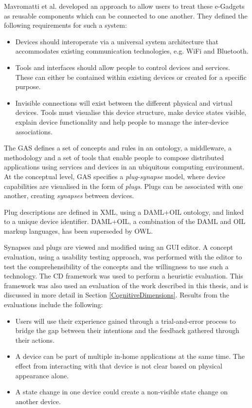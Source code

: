 Mavromatti et al. \cite{Mavrommati2004} developed an approach to allow users to treat these e-Gadgets as reusable components which can be connected to one another. They defined the following requirements for such a system:

\begin{itemize}
	\item Devices should interoperate via a universal system architecture that accommodates existing communication technologies, e.g. WiFi and Bluetooth.
	\item Tools and interfaces should allow people to control devices and services. These can either be contained within existing devices or created for a specific purpose.
	\item Invisible connections will exist between the different physical and virtual devices. Tools must visualise this device structure, make device states visible, explain device functionality and help people to manage the inter-device associations.
\end{itemize}

The \ac{GAS} defines a set of concepts and rules in an ontology, a middleware, a methodology and a set of tools that enable people to compose distributed applications using services and devices in an ubiquitous computing environment. At the conceptual level, \ac{GAS} specifies a \emph{plug-synapse} model, where device capabilities are visualised in the form of \emph{plugs}. Plugs can be associated with one another, creating \emph{synapses} between devices.

Plug descriptions are defined in \ac{XML}, using a DAML+OIL ontology, and linked to a unique device identifier. DAML+OIL, a combination of the \ac{DAML} and \ac{OIL} markup languages, has been superseded by \ac{OWL}. 

Synapses and plugs are viewed and modified using an \ac{GUI} editor. A concept evaluation, using a usability testing approach, was performed with the editor to test the comprehensibility of the concepts and the willingness to use such a technology. The \ac{CD} framework was used to perform a heuristic evaluation. This framework was also used an evaluation of the work described in this thesis, and is discussed in more detail in Section \ref{CognitiveDimensions}. Results from the evaluations include the following:

\begin{itemize}
	\item Users will use their experience gained through a trial-and-error process to bridge the gap between their intentions and the feedback gathered through their actions.
	\item A device can be part of multiple in-home applications at the same time. The effect from interacting with that device is not clear based on physical appearance alone.
	\item A state change in one device could create a non-visible state change on another device.
\end{itemize}

